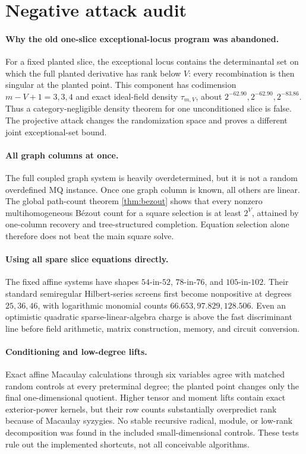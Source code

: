 \documentclass[10pt,a4paper]{article}
\begin{document}
\section{Negative attack audit}\label{app:negative}

\paragraph{Why the old one-slice exceptional-locus program was abandoned.}
For a fixed planted slice, the exceptional locus contains the determinantal set on which the full planted derivative has rank below $V$: every recombination is then singular at the planted point.  This component has codimension $m-V+1=3,3,4$ and exact ideal-field density $\tau_{m,V}$, about $2^{-62.90},2^{-62.90},2^{-83.86}$.  Thus a category-negligible density theorem for one unconditioned slice is false.  The projective attack changes the randomization space and proves a different joint exceptional-set bound.

\paragraph{All graph columns at once.}
The full coupled graph system is heavily overdetermined, but it is not a random overdefined MQ instance.  Once one graph column is known, all others are linear.  The global path-count theorem \cref{thm:bezout} shows that every nonzero multihomogeneous B\'ezout count for a square selection is at least $2^V$, attained by one-column recovery and tree-structured completion.  Equation selection alone therefore does not beat the main square solve.

\paragraph{Using all spare slice equations directly.}
The fixed affine systems have shapes $54$-in-$52$, $78$-in-$76$, and $105$-in-$102$.  Their standard semiregular Hilbert-series screens first become nonpositive at degrees $25,36,46$, with logarithmic monomial counts $66.653,97.829,128.506$.  Even an optimistic quadratic sparse-linear-algebra charge is above the fast discriminant line before field arithmetic, matrix construction, memory, and circuit conversion.

\paragraph{Conditioning and low-degree lifts.}
Exact affine Macaulay calculations through six variables agree with matched random controls at every preterminal degree; the planted point changes only the final one-dimensional quotient.  Higher tensor and moment lifts contain exact exterior-power kernels, but their row counts substantially overpredict rank because of Macaulay syzygies.  No stable recursive radical, module, or low-rank decomposition was found in the included small-dimensional controls.  These tests rule out the implemented shortcuts, not all conceivable algorithms.
\end{document}
